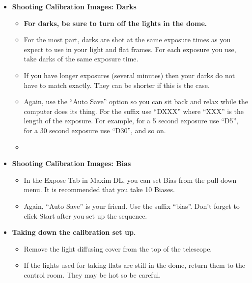 \documentclass[letterpaper, 12pt]{report}
\begin{document}
	\begin{itemize}
		\item  {\large \textbf{Shooting Calibration Images: Darks}}
		\begin{itemize}
			\item \textbf{For darks, be sure to turn off the lights in the dome.}
			\item For the most part, darks are shot at the same exposure times as you expect to use in your light and flat frames. For each exposure you use, take darks of the same exposure time.
			\item If you have longer exposures (several minutes) then your darks do not have to match exactly. They can be shorter if this is the case.
			\item Again, use the ``Auto Save'' option so you can sit back and relax while the computer does its thing. For the suffix use ``DXXX'' where ``XXX'' is the length of the exposure. For example, for a 5 second exposure use ``D5'', for a 30 second exposure use ``D30'', and so on.
			\item
		\end{itemize}
		\item {\large \textbf{Shooting Calibration Images: Bias}}
		\begin{itemize}
			\item In the Expose Tab in Maxim DL, you can set Bias from the pull down menu. It is recommended that you take 10 Biases.
			\item Again, ``Auto Save'' is your friend. Use the suffix ``bias''. Don't forget to click Start after you set up the sequence.
		\end{itemize}
		\item {\large \textbf{Taking down the calibration set up.}}
		\begin{itemize}
			\item Remove the light diffusing cover from the top of the telescope.
			\item If the lights used for taking flats are still in the dome, return them to the control room. They may be hot so be careful.
	\end{itemize}

\end{itemize}
\newpage
\end{document}
